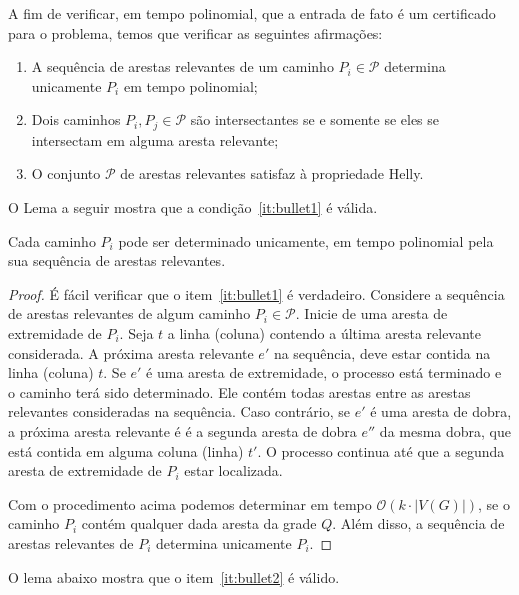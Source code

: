A fim de verificar, em tempo polinomial, que a entrada de fato é um certificado para o problema, temos que verificar as seguintes afirmações:

\begin{enumerate}[label=(\roman*)]
\item A sequência de arestas relevantes de um caminho $P_i\in \mathcal{P}$ determina unicamente $P_i$ em tempo polinomial; \label{it:bullet1}

\item Dois caminhos  $P_i, P_j \in \mathcal{P}$ são intersectantes se e somente se eles se intersectam em alguma aresta relevante; \label{it:bullet2}

\item O conjunto  $\mathcal{P}$ de arestas relevantes satisfaz à propriedade Helly. \label{it:bullet3}
\end{enumerate}

O Lema a seguir mostra que a condição~\ref{it:bullet1} é válida.

\begin{lema}\label{lem:verify1}
Cada caminho $P_i$ pode ser determinado unicamente, em tempo polinomial pela sua sequência de arestas relevantes.
\end{lema}

\begin{proof}
É fácil verificar que o item~\ref{it:bullet1} é verdadeiro. Considere a sequência de arestas relevantes de algum caminho $P_i\in \mathcal{P}$. Inicie de uma aresta de extremidade de $P_i$. Seja   $t$ a linha (coluna) contendo a última aresta relevante considerada. A próxima aresta relevante  $e'$ na sequência, deve estar contida na linha (coluna) $t$. Se $e'$ é uma aresta de extremidade, o processo está terminado e o caminho terá sido determinado. Ele contém todas arestas entre as arestas relevantes consideradas na sequência.  Caso contrário, se  $e'$ é uma aresta de dobra, a próxima aresta relevante é é a segunda aresta de dobra  $e''$ da mesma dobra, que está contida em alguma coluna (linha) $t'$. O processo continua até que a segunda aresta de extremidade de $P_i$ estar localizada.   

Com o procedimento acima podemos determinar em tempo $\mathcal{O}(k\cdot |V(G)|)$, se o caminho $P_i$ contém qualquer dada aresta da grade $Q$. Além disso, a sequência de arestas relevantes de  $P_i$ determina unicamente  $P_i$.
 \end{proof} %

O lema abaixo mostra que o item~\ref{it:bullet2} é válido.

